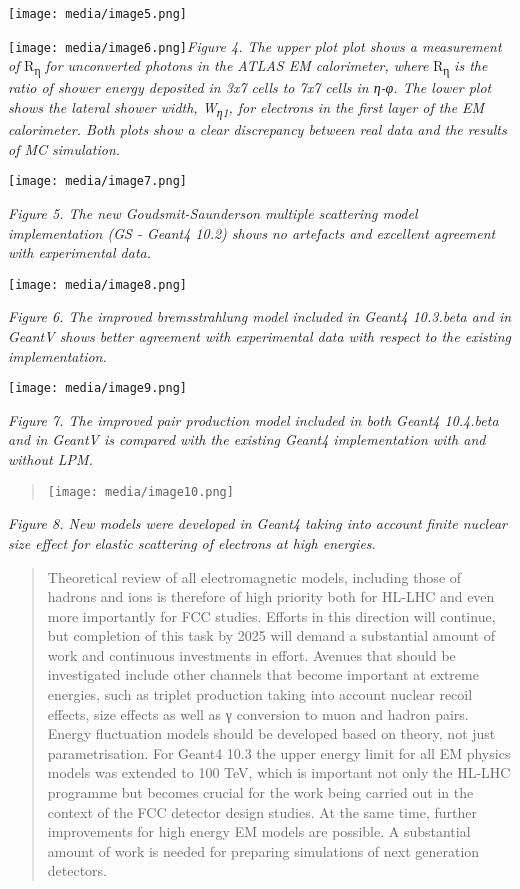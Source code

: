 \documentclass[12pt,a4paper]{article}
\begin{document}
\texttt{[image: media/image5.png]}

\texttt{[image: media/image6.png]}\emph{Figure
4. The upper plot plot shows a measurement of} R\textsubscript{η}
\emph{for unconverted photons in the ATLAS EM calorimeter, where}
R\textsubscript{η} \emph{is the ratio of shower energy deposited in 3x7
cells to 7x7 cells in η-φ. The lower plot shows the lateral shower
width, W\textsubscript{η1}, for electrons in the first layer of the EM
calorimeter. Both plots show a clear discrepancy between real data and
the results of MC simulation.}

\texttt{[image: media/image7.png]}

\emph{Figure 5. The new Goudsmit-Saunderson} \emph{multiple scattering
model implementation (GS - Geant4 10.2) shows no artefacts and excellent
agreement with experimental data. }

\texttt{[image: media/image8.png]}

\emph{Figure 6. The improved bremsstrahlung model included in Geant4
10.3.beta and in GeantV shows better agreement with experimental data
with respect to the existing implementation.}

\texttt{[image: media/image9.png]}

\emph{Figure 7. The improved pair production model included in both
Geant4 10.4.beta and in GeantV is compared with the existing Geant4
implementation with and without LPM. }

\begin{quote}
\texttt{[image: media/image10.png]}
\end{quote}

\emph{Figure 8. New models were developed in Geant4 taking into account
finite nuclear size effect for elastic scattering of electrons at high
energies. }

\begin{quote}
Theoretical review of all electromagnetic models, including those of
hadrons and ions is therefore of high priority both for HL-LHC and even
more importantly for FCC studies. Efforts in this direction will
continue, but completion of this task by 2025 will demand a substantial
amount of work and continuous investments in effort. Avenues that should
be investigated include other channels that become important at extreme
energies, such as triplet production taking into account nuclear recoil
effects, size effects as well as γ conversion to muon and hadron pairs.
Energy fluctuation models should be developed based on theory, not just
parametrisation. For Geant4 10.3 the upper energy limit for all EM
physics models was extended to 100 TeV, which is important not only the
HL-LHC programme but becomes crucial for the work being carried out in
the context of the FCC detector design studies. At the same time,
further improvements for high energy EM models are possible. A
substantial amount of work is needed for preparing simulations of next
generation detectors.
\end{quote}
\end{document}
